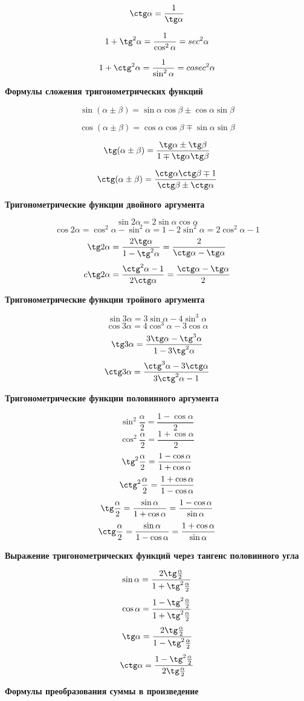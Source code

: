 \documentclass[a5paper, 8pt]{extarticle}
\begin{document}
$$\ctg\alpha = \frac{1}{\tg\alpha}$$

$$1+\tg^2\alpha =\frac{1}{\cos^2\alpha}=sec^2\alpha$$

$$1+\ctg^2\alpha =\frac{1}{\sin^2\alpha}=cosec^2\alpha$$

\textbf{Формулы сложения тригонометрических функций}

$$\sin(\alpha \pm \beta )=\sin \alpha \cos \beta \pm \cos \alpha \sin \beta $$

$$\cos(\alpha \pm \beta )=\cos \alpha \cos\beta \mp \sin\alpha\sin\beta$$

$$\tg(\alpha\pm\beta)=\frac{\tg\alpha\pm\tg\beta}{1\mp\tg\alpha\tg\beta}$$

$$\ctg(\alpha\pm\beta)=\frac{\ctg\alpha\ctg\beta\mp1}{\ctg\beta\pm\ctg\alpha}$$

\textbf{Тригонометрические функции двойного аргумента}

$$\sin2\alpha=2\sin\alpha\cos\alpha$$
$$\cos2\alpha=\cos^2\alpha-\sin^2\alpha=1-2\sin^2\alpha=2\cos^2\alpha-1$$
$$\tg2\alpha=\frac{2\tg\alpha}{1-\tg^2\alpha}=\frac{2}{\ctg\alpha-\tg\alpha}$$
$$c\tg2\alpha=\frac{\ctg^2\alpha-1}{2\ctg\alpha}=\frac{\ctg\alpha-\tg\alpha}{2}$$

\textbf{Тригонометрические функции тройного аргумента}

$$\sin3\alpha=3\sin\alpha-4\sin^3\alpha$$
$$\cos3\alpha=4\cos^3\alpha - 3\cos\alpha$$
$$\tg3\alpha=\frac{3\tg\alpha-\tg^3\alpha}{1-3\tg^2\alpha}$$
$$\ctg3\alpha=\frac{\ctg^3\alpha-3\ctg\alpha}{3\ctg^2\alpha-1}$$

\textbf{Тригонометрические функции половинного аргумента}

$$\sin^2\frac{\alpha}{2}=\frac{1-\cos\alpha}{2}$$
$$\cos^2\frac{\alpha}{2}=\frac{1+\cos\alpha}{2}$$
$$\tg^2\frac{\alpha}{2}=\frac{1-\cos\alpha}{1+\cos\alpha}$$
$$\ctg^2\frac{\alpha}{2}=\frac{1+\cos\alpha}{1-\cos\alpha}$$
$$\tg\frac{\alpha}{2}=\frac{\sin\alpha}{1+\cos\alpha}=\frac{1-\cos\alpha}{\sin\alpha}$$
$$\ctg\frac{\alpha}{2}=\frac{\sin\alpha}{1-\cos\alpha}=\frac{1+\cos\alpha}{\sin\alpha}$$

\textbf{Выражение тригонометрических функций через тангенс половинного угла}

$$\sin\alpha=\frac{2\tg\frac{\alpha}{2}}{1+\tg^2\frac{\alpha}{2}}$$
$$\cos\alpha=\frac{1-\tg^2\frac{\alpha}{2}}{1+\tg^2\frac{\alpha}{2}}$$
$$\tg\alpha=\frac{2\tg\frac{\alpha}{2}}{1-\tg^2\frac{\alpha}{2}}$$
$$\ctg\alpha=\frac{1-\tg^2\frac{\alpha}{2}}{2\tg\frac{\alpha}{2}}$$

\textbf{Формулы преобразования суммы в произведение}
\end{document}
